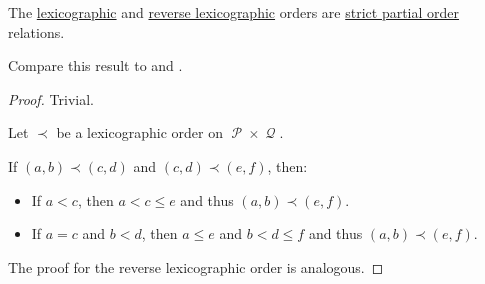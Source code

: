 \begin{proposition}\label{thm:lexicographic_order_is_partial_order}
  The \hyperref[eq:def:lexicographic_order]{lexicographic} and \hyperref[eq:def:lexicographic_order/reverse]{reverse lexicographic} orders are \hyperref[def:partially_ordered_set/strict]{strict partial order} relations.

  Compare this result to  and .
\end{proposition}
\begin{proof}
   Trivial.

   Let \( \prec \) be a lexicographic order on \( \mscrP \times \mscrQ \).

  If \( (a, b) \prec (c, d) \) and \( (c, d) \prec (e, f) \), then:
  \begin{itemize}
    \item If \( a < c \), then \( a < c \leq e \) and thus \( (a, b) \prec (e, f) \).

    \item If \( a = c \) and \( b < d \), then \( a \leq e \) and \( b < d \leq f \) and thus \( (a, b) \prec (e, f) \).
  \end{itemize}

   The proof for the reverse lexicographic order is analogous.
\end{proof}

